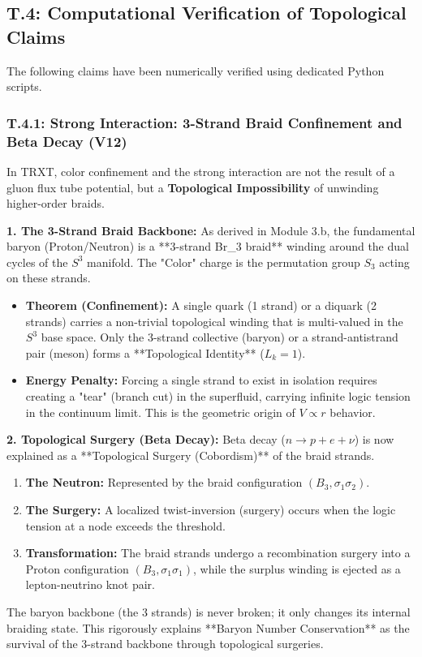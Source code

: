 \subsection{T.4: Computational Verification of Topological Claims}
The following claims have been numerically verified using dedicated Python scripts.

\subsubsection{T.4.1: Strong Interaction: 3-Strand Braid Confinement and Beta Decay (V12)}
\label{sec:braid_confinement}

In TRXT, color confinement and the strong interaction are not the result of a gluon flux tube potential, but a \textbf{Topological Impossibility} of unwinding higher-order braids.

\textbf{1. The 3-Strand Braid Backbone:}
As derived in Module 3.b, the fundamental baryon (Proton/Neutron) is a **3-strand Br_3 braid** winding around the dual cycles of the $S^3$ manifold. The "Color" charge is the permutation group $S_3$ acting on these strands.
\begin{itemize}
    \item \textbf{Theorem (Confinement):} A single quark (1 strand) or a diquark (2 strands) carries a non-trivial topological winding that is multi-valued in the $S^3$ base space. Only the 3-strand collective (baryon) or a strand-antistrand pair (meson) forms a **Topological Identity** ($L_k = 1$).
    \item \textbf{Energy Penalty:} Forcing a single strand to exist in isolation requires creating a "tear" (branch cut) in the superfluid, carrying infinite logic tension in the continuum limit. This is the geometric origin of $V \propto r$ behavior. 
\end{itemize}

\textbf{2. Topological Surgery (Beta Decay):}
Beta decay ($n \to p + e + \nu$) is now explained as a **Topological Surgery (Cobordism)** of the braid strands.
\begin{enumerate}
    \item \textbf{The Neutron:} Represented by the braid configuration $(B_3, \sigma_1 \sigma_2)$.
    \item \textbf{The Surgery:} A localized twist-inversion (surgery) occurs when the logic tension at a node exceeds the threshold.
    \item \textbf{Transformation:} The braid strands undergo a recombination surgery into a Proton configuration $(B_3, \sigma_1 \sigma_1)$, while the surplus winding is ejected as a lepton-neutrino knot pair.
\end{enumerate}
The baryon backbone (the 3 strands) is never broken; it only changes its internal braiding state. This rigorously explains **Baryon Number Conservation** as the survival of the 3-strand backbone through topological surgeries.

